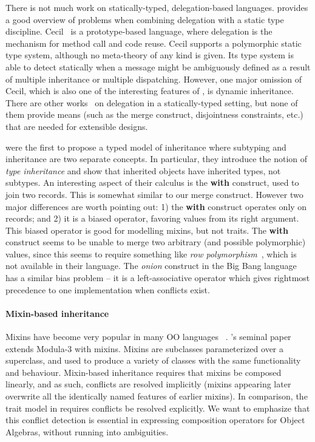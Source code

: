 There is not much work on statically-typed, delegation-based languages.
\citet{kniesel1999type} provides a good overview of problems when combining
delegation with a static type discipline. Cecil~\cite{chambers1992object,
  chambers1993cecil} is a prototype-based language, where delegation is the
mechanism for method call and code reuse. Cecil supports a polymorphic static
type system, although no meta-theory of any kind is given. Its type system is
able to detect statically when a message might be ambiguously defined as a
result of multiple inheritance or multiple dispatching. However, one major
omission of Cecil, which is also one of the interesting features of \name, is
dynamic inheritance. There are other
works~\cite{fisher1995delegation,anderson2003can} on delegation in a
statically-typed setting, but none of them provide means (such as the merge
construct, disjointness constraints, etc.) that are needed for extensible
designs.

\citet{cook1989inheritance} were the first to propose a typed model of
inheritance where subtyping and inheritance are two separate concepts. In
particular, they introduce the notion of \textit{type inheritance} and show that
inherited objects have inherited types, not subtypes. An interesting aspect of
their calculus is the \textbf{with} construct, used to join two records. This is
somewhat similar to our merge construct. However two major differences are worth
pointing out: 1) the \textbf{with} construct operates only on records; and 2) it
is a biased operator, favoring values from its right argument. This biased
operator is good for modelling mixins, but not traits. The
\textbf{with} construct seems to be unable to merge two arbitrary (and possible
polymorphic) values, since this seems to require something like
\emph{row polymorphism}~\cite{wand1987complete,wand1989type}, which is not available in their language.
The \textit{onion} construct in the Big Bang
language~\cite{palmer2015building,menon2012big} has a similar bias problem -- it is a
left-associative operator which gives rightmost precedence to one
implementation when conflicts exist.

\paragraph{Mixin-based inheritance}

Mixins have become very popular in many OO languages
~\cite{flatt1998classes,bono1999core, ancona2003jam}. \citeauthor{bracha1990mixin}'s
seminal paper~\citep{bracha1990mixin} extends Modula-3 with mixins. Mixins are subclasses parameterized
over a superclass, and used to produce a variety of classes with the same
functionality and behaviour. Mixin-based inheritance requires that mixins be
composed linearly, and as such, conflicts are resolved implicitly (mixins
appearing later overwrite all the identically named features of earlier mixins).
In comparison, the trait model in \name requires conflicts be resolved
explicitly. We want to emphasize that this conflict detection is essential in
expressing composition operators for Object Algebras, without running
into ambiguities.


